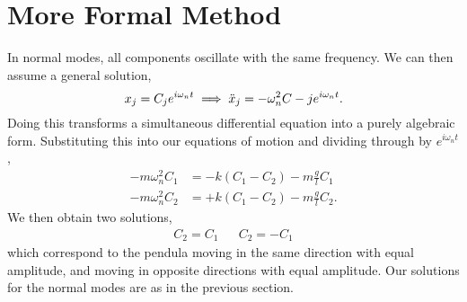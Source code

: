 \documentclass{book}
\begin{document}
\section{More Formal Method}
In normal modes, all components oscillate with the same frequency. We can then assume a general solution,
\begin{equation}
	x_j = C_j e^{i\omega_n t} \implies \Ddot{x}_j = -\omega_n^2C-j e^{i\omega_n t}.
\end{equation}
Doing this transforms a simultaneous differential equation into a purely algebraic form. Substituting this into our equations of motion and dividing through by $e^{i\omega_nt}$, 
\begin{align}
	-m\omega_n^2C_1 & = - k(C_1 -C_2) - m\frac{g}{l}C_1 \\
	-m\omega_n^2C_2 & = + k(C_1 - C_2) - m\frac{g}{l}C_2.
\end{align}
We then obtain two solutions,
\begin{align}
	C_2 = C_1 && C_2 = -C_1
\end{align}
which correspond to the pendula moving in the same direction with equal amplitude, and moving in opposite directions with equal amplitude. Our solutions for the normal modes are as in the previous section.
\end{document}
